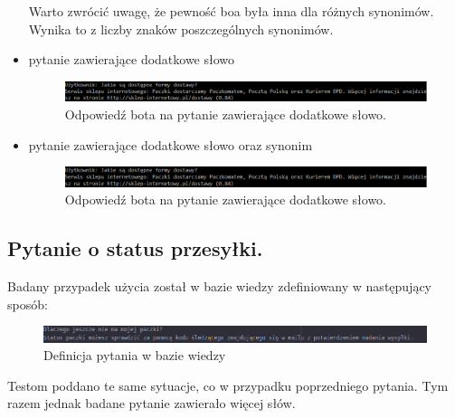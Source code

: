 \begin{itemize}
    Warto zwrócić uwagę, że pewność boa była inna dla różnych synonimów. Wynika to z liczby znaków poszczególnych synonimów.
	\item
	pytanie zawierające dodatkowe słowo
	
	    \begin{figure}[ht]
	{\centering
		\includegraphics[width=0.9\linewidth]{rys/rys03/13}
	\caption{Odpowiedź bota na pytanie zawierające dodatkowe słowo.}
	}
	\label{fig:bot4}
    \end{figure}
    
    \newpage 
    
	\item
	pytanie zawierające dodatkowe słowo oraz synonim
	
	    \begin{figure}[ht]
	{\centering
		\includegraphics[width=0.9\linewidth]{rys/rys03/13}
	\caption{Odpowiedź bota na pytanie zawierające dodatkowe słowo.}
	}
	\label{fig:bot4}
    \end{figure}
    
\end{itemize}

\subsection{Pytanie o status przesyłki.}

Badany przypadek użycia został w bazie wiedzy zdefiniowany w następujący sposób:

\begin{figure}[ht]
	{\centering
		\includegraphics[width=0.9\linewidth]{rys/rys03/15}
	\caption{Definicja pytania w bazie wiedzy}
	}
	\label{fig:bot4}
    \end{figure}

Testom poddano te same sytuacje, co w przypadku poprzedniego pytania. Tym razem jednak badane pytanie zawierało więcej słów.


